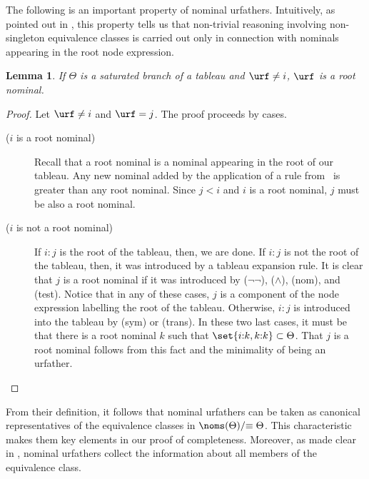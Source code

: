 \documentclass[10pt,a4paper]{amsart}
\newtheorem{lem}[thm]{Lemma}
\theoremstyle{definition}
\newtheorem{defi}[thm]{Definition}
\theoremstyle{remark}
\begin{document}
The following is an important property of nominal urfathers.
Intuitively, as pointed out in \cite{Brauner2011}, this property tells us that non-trivial reasoning involving non-singleton equivalence classes is carried out only in connection with nominals appearing in the root node expression.

\begin{lem}\label{lemma:representative}
    If $\Theta$ is a saturated branch of a tableau and $\urf \neq i$, $\urf$ is a root nominal.
\end{lem}
\begin{proof}
    Let $\urf \neq i$ and $\urf = j$.
    The proof proceeds by cases.
    
    \begin{description}
        \item[($i$ is a root nominal)]
        Recall that a root nominal is a nominal appearing in the root of our tableau. Any new nominal added by the application of a rule from~ is greater than any root nominal. Since $j < i$ and $i$ is a root nominal, $j$ must be also a root nominal.

        \item[($i$ is not a root nominal)]
        If $i{:}j$ is the root of the tableau, then, we are done.
        If $i{:}j$ is not the root of the tableau, then, it was introduced by a tableau expansion rule.
        It is clear that $j$ is a root nominal if it was introduced by ($\lnot\lnot$), ($\land$), (nom), and (test).
        Notice that in any of these cases, $j$ is a component of the node expression labelling the root of the tableau.
        Otherwise, $i{:}j$ is introduced into the tableau by (sym) or (trans).
        In these two last cases, it must be that there is a root nominal $k$ such that $\set{i{:}k, k{:}k} \subset \Theta$.
        That $j$ is a root nominal follows from this fact and the minimality of being an urfather.
    \end{description}
\end{proof}

From their definition, it follows that nominal urfathers can be taken as canonical representatives of the equivalence classes in $\noms(\Theta)/{\equiv\Theta}$.
This characteristic makes them key elements in our proof of completeness.
Moreover, as made clear in , nominal urfathers collect the information about all members of the equivalence class.
\end{document}
